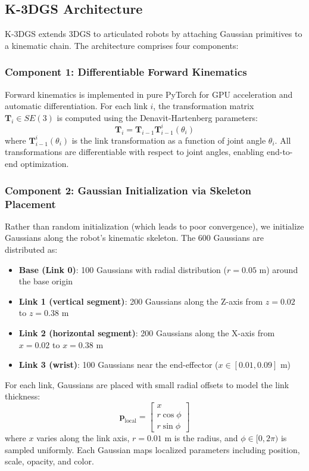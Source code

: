 \documentclass[12pt,a4paper,oneside]{report}
\begin{document}
\subsection{K-3DGS Architecture}

K-3DGS extends 3DGS to articulated robots by attaching Gaussian primitives to a kinematic chain. The architecture comprises four components:

\subsubsection{Component 1: Differentiable Forward Kinematics}

Forward kinematics is implemented in pure PyTorch for GPU acceleration and automatic differentiation. For each link $i$, the transformation matrix $\mathbf{T}_i \in SE(3)$ is computed using the Denavit-Hartenberg parameters:
\begin{equation}
\mathbf{T}_i = \mathbf{T}_{i-1} \mathbf{T}_{i-1}^{i}(\theta_i)
\end{equation}
where $\mathbf{T}_{i-1}^{i}(\theta_i)$ is the link transformation as a function of joint angle $\theta_i$. All transformations are differentiable with respect to joint angles, enabling end-to-end optimization.

\subsubsection{Component 2: Gaussian Initialization via Skeleton Placement}

Rather than random initialization (which leads to poor convergence), we initialize Gaussians along the robot's kinematic skeleton. The 600 Gaussians are distributed as:
\begin{itemize}
    \item \textbf{Base (Link 0)}: 100 Gaussians with radial distribution ($r = 0.05$ m) around the base origin
    \item \textbf{Link 1 (vertical segment)}: 200 Gaussians along the Z-axis from $z=0.02$ to $z=0.38$ m
    \item \textbf{Link 2 (horizontal segment)}: 200 Gaussians along the X-axis from $x=0.02$ to $x=0.38$ m
    \item \textbf{Link 3 (wrist)}: 100 Gaussians near the end-effector ($x \in [0.01, 0.09]$ m)
\end{itemize}

For each link, Gaussians are placed with small radial offsets to model the link thickness:
\begin{equation}
\mathbf{p}_{\text{local}} = \begin{bmatrix} x \\ r \cos\phi \\ r \sin\phi \end{bmatrix}
\end{equation}
where $x$ varies along the link axis, $r = 0.01$ m is the radius, and $\phi \in [0, 2\pi)$ is sampled uniformly. Each Gaussian maps localized parameters including position, scale, opacity, and color.
\end{document}
